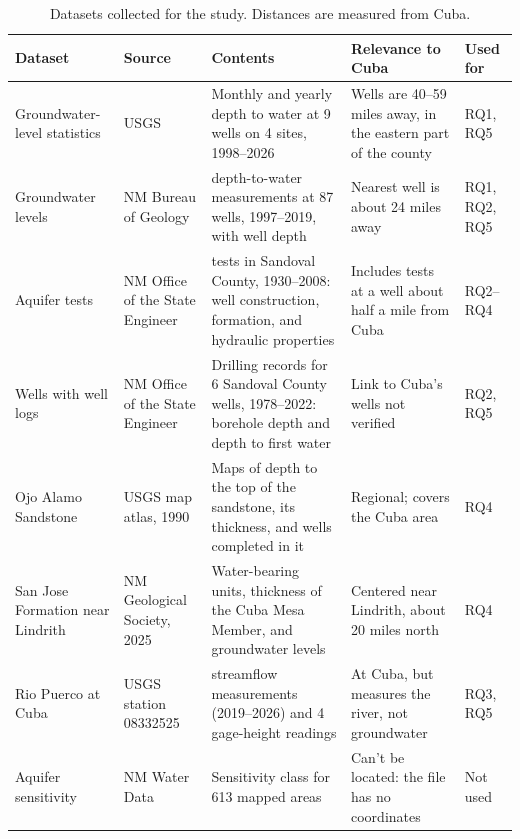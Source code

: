 \documentclass[10pt,twocolumn,letterpaper]{article}
\begin{document}
\begin{table}[t]
  \caption{Datasets collected for the study. Distances are measured from Cuba.}
  \label{tab:datasets}
  \footnotesize
  \begin{tabularx}{\textwidth}{@{}>{\raggedright}p{0.9in}>{\raggedright}p{0.95in}
      >{\raggedright\arraybackslash}X>{\raggedright\arraybackslash}X l@{}}
    \toprule
    \textbf{Dataset} & \textbf{Source} & \textbf{Contents} & \textbf{Relevance to Cuba} & \textbf{Used for} \\
    \midrule
    Groundwater-level statistics & USGS & Monthly and yearly depth to water at 9 wells on 4 sites,
      1998--2026 & Wells are 40--59 miles away, in the eastern part of the county & RQ1, RQ5 \\
    Groundwater levels & NM Bureau of Geology & 456 depth-to-water measurements at 87 wells,
      1997--2019, with well depth & Nearest well is about 24 miles away & RQ1, RQ2, RQ5 \\
    Aquifer tests & NM Office of the State Engineer & 179 tests in Sandoval County, 1930--2008:
      well construction, formation, and hydraulic properties & Includes tests at a well about
      half a mile from Cuba & RQ2--RQ4 \\
    Wells with well logs & NM Office of the State Engineer & Drilling records for 6 Sandoval
      County wells, 1978--2022: borehole depth and depth to first water & Link to Cuba's wells
      not verified & RQ2, RQ5 \\
    Ojo Alamo Sandstone & USGS map atlas, 1990 & Maps of depth to the top of the sandstone, its
      thickness, and wells completed in it & Regional; covers the Cuba area & RQ4 \\
    San Jose Formation near Lindrith & NM Geological Society, 2025 & Water-bearing units,
      thickness of the Cuba Mesa Member, and groundwater levels & Centered near Lindrith, about
      20 miles north & RQ4 \\
    Rio Puerco at Cuba & USGS station 08332525 & 10 streamflow measurements (2019--2026) and
      4 gage-height readings & At Cuba, but measures the river, not groundwater & RQ3, RQ5 \\
    Aquifer sensitivity & NM Water Data & Sensitivity class for 613 mapped areas & Can't be
      located: the file has no coordinates & Not used \\
    \bottomrule
  \end{tabularx}
\end{table}
\end{document}

